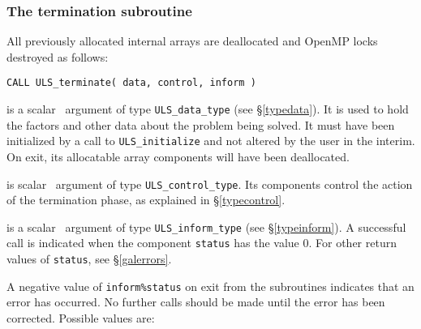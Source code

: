 \documentclass{galahad}
\newcommand{\packagename}{ULS}
\begin{document}

\subsubsection{The termination subroutine}
All previously allocated internal arrays are deallocated and OpenMP locks
destroyed as follows:

\hskip0.5in 
{\tt CALL \packagename\_terminate( data, control, inform )}

\begin{description}

 is a scalar \intentinout\ argument of type 
{\tt \packagename\_data\_type}
(see \S\ref{typedata}). It is used to hold the factors and other 
data about the problem being solved. 
It must have been initialized by a call to
{\tt \packagename\_ini\-tialize} and not altered by the user in the interim.
On exit, its allocatable array components will have been deallocated.

 is scalar \intentin\ argument of type 
{\tt \packagename\_control\_type}. Its components control the action
of the termination phase, as explained in 
\S\ref{typecontrol}. 
 
 is a scalar \intentinout\ argument of type 
{\tt \packagename\_inform\_type}
(see \S\ref{typeinform}). 
A successful call is indicated when the  component {\tt status} has the value 0. 
For other return values of {\tt status}, see \S\ref{galerrors}.

\end{description}


\galerrors
A negative value of {\tt inform\%status} on exit from the subroutines
indicates that an error has occurred. No further calls should be made
until the error has been corrected. Possible values are:
\end{document}
